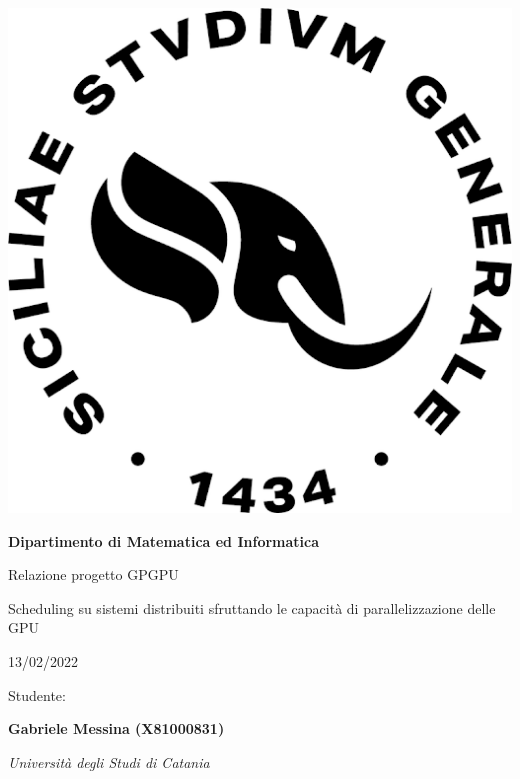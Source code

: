 \documentclass[../relazione.tex]{subfiles}
\begin{document}
\begin{titlepage}\centering

    \includegraphics[scale=.30]{images/logo_unict.png}
    \vspace{1cm}

    {\LARGE\bfseries Dipartimento di Matematica ed Informatica}

    \vspace{1cm}

    {\Large Relazione progetto GPGPU}

    \vspace{.5cm}

    {\large Scheduling su sistemi distribuiti sfruttando le capacità di parallelizzazione delle GPU}
    
    \vspace{.5cm}

    {\large 13/02/2022}

    \vspace{2cm}

    {\large Studente:}

    {\bfseries Gabriele Messina (X81000831)}

    \vfill

    {\itshape Università degli Studi di Catania}
\end{titlepage}
\end{document}
